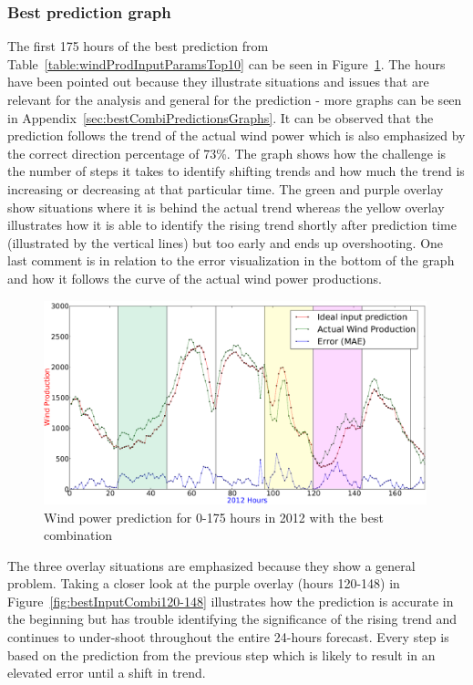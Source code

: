 \subsubsection{Best prediction graph}
\label{sec:bestInputCombiGraph}
The first 175 hours of the best prediction from Table~\ref{table:windProdInputParamsTop10} can be seen in Figure~\ref{fig:bestInputParameterPrediction}. The hours have been pointed out because they illustrate situations and issues that are relevant for the analysis and general for the prediction - more graphs can be seen in Appendix~\ref{sec:bestCombiPredictionsGraphs}. It can be observed that the prediction follows the trend of the actual wind power which is also emphasized by the correct direction percentage of 73\%. The graph shows how the challenge is the number of steps it takes to identify shifting trends and how much the trend is increasing or decreasing at that particular time. The green and purple overlay show situations where it is behind the actual trend whereas the yellow overlay illustrates how it is able to identify the rising trend shortly after prediction time (illustrated by the vertical lines) but too early and ends up overshooting. One last comment is in relation to the error visualization in the bottom of the graph and how it follows the curve of the actual wind power productions.  

\begin{figure}[H]
\centering
\includegraphics[width=0.99\textwidth]{billeder/bestInputParameterPrediction.png}
\caption{Wind power prediction for 0-175 hours in 2012 with the best combination}
\label{fig:bestInputParameterPrediction}
\end{figure} 

The three overlay situations are emphasized because they show a general problem. Taking a closer look at the purple overlay (hours 120-148) in Figure~\ref{fig:bestInputCombi120-148} illustrates how the prediction is accurate in the beginning but has trouble identifying the significance of the rising trend and continues to under-shoot throughout the entire 24-hours forecast. Every step is based on the prediction from the previous step which is likely to result in an elevated error until a shift in trend.

